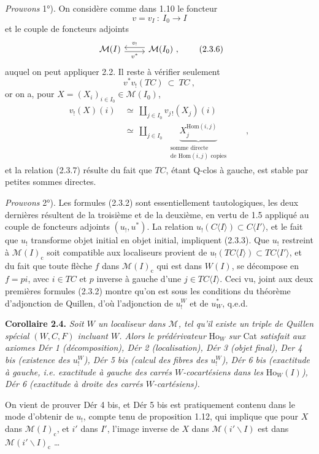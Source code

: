 \documentclass[11pt]{article}
\newcommand{\msp}[1]{\marginpar{\footnotesize [#1]}}
\newcommand{\M}{\mathcal{M}}
\newcommand{\Ho}{\mathrm{Ho}}
\newcommand{\cc}{\mathrm{c}}
\begin{document}
\textit{Prouvons} 1°). On considère comme dans 1.10 le foncteur
\[
v = v_I\ :\ I_0 \longrightarrow I
\]
et le couple de foncteurs adjoints
\[
\begin{tikzcd}
\M(I) \arrow[r, shift right, "v^*"'] & \M(I_0)\ , \arrow[l, shift right, "v_!"']
\end{tikzcd}
\tag*{(2.3.6)}
\]
auquel on peut appliquer 2.2. Il reste
\msp{page 21}
à vérifier seulement
\[
v^*v_!(TC)\ \subset\ TC\ ,
\tag*{(2.3.7)}
\]
or on a, pour $X = (X_i)_{i \in I_0} \in \M(I_0)$,
\[
\begin{aligned}
v_!(X)(i) &\ \simeq\ \textstyle\coprod_{j \in I_0} v_{j\,!}(X_j)(i)\\
&\ \simeq\ \textstyle\coprod_{j \in I_0}\ \ \underbrace{X_j^{\mathrm{Hom}(i,j)}}_{\substack{\text{somme directe}\\ \text{de }\mathrm{Hom}(i,j)\text{ copies}}}\qquad ,
\end{aligned}
\]
et la relation (2.3.7) résulte du fait que $TC$, étant Q-clos à gauche, est stable par petites sommes directes.

\textit{Prouvons} 2°). Les formules (2.3.2) sont essentiellement tautologiques, les deux dernières résultent de la troisième et de la deuxième, en vertu de 1.5 appliqué au couple de foncteurs adjoints $(u_!,u^*)$. La relation $u_!(C\langle I\rangle) \subset C\langle I'\rangle$, et le fait que $u_!$ transforme objet initial en objet initial, impliquent (2.3.3). Que $u_!$ restreint à $\M(I)_{\cc}$ soit compatible aux localiseurs provient de $u_!(TC\langle I\rangle) \subset TC\langle I'\rangle$, et du fait que toute flèche $f$ dans $\M(I)_{\cc}$ qui est dans $W(I)$, se décompose en $f = pi$, avec $i \in TC$ et $p$ inverse à gauche d'une $j \in TC\langle I\rangle$. Ceci vu, joint aux deux premières formules (2.3.2) montre qu'on est sous les conditions
\msp{page 22}
du théorème d'adjonction de Quillen, d'où l'adjonction de $u_!^W$ et de $u^*_W$, q.e.d.

\textbf{Corollaire 2.4.} \textit{Soit $W$ un localiseur dans $\M$, tel qu'il existe un triple de Quillen spécial $(W,C,F)$ incluant $W$. Alors le prédérivateur} $\Ho_W$ \textit{sur} Cat \textit{satisfait aux axiomes Dér 1 (décomposition), Dér 2 (localisation), Dér 3 (objet final), Der 4 bis (existence des $u_!^W$), Dér 5 bis (calcul des fibres des $u_!^W$), Dér 6 bis (exactitude à gauche, i.e. exactitude à gauche des carrés $W$-cocartésiens dans les} $\Ho_W(I)$\textit{), Dér 6 (exactitude à droite des carrés $W$-cartésiens).} %

On vient de prouver Dér 4 bis, et Dér 5 bis est pratiquement contenu dans le mode d'obtenir de $u_!$, compte tenu de proposition 1.12, qui implique que pour $X$ dans $\M(I)_{\cc}$, et $i'$ dans $I'$, l'image inverse de $X$ dans $\M(i'\backslash I)$ est dans $\M(i'\backslash I)_{\cc}$ \dots
\end{document}
